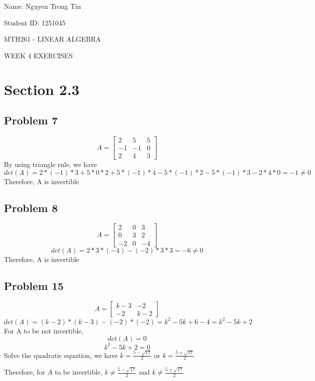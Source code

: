\documentclass[a4paper,12pt]{report}
\begin{document}
Name: Nguyen Trong Tin

Student ID: 1251045 

\centerline{MTH261 - LINEAR ALGEBRA}
\centerline{WEEK 4 EXERCISES}

\section*{Section 2.3}
\subsection*{Problem 7}
\[
A 
=
\begin{bmatrix}
    2       & 5 & 5 \\
    -1       & -1 & 0 \\
    2       & 4 & 3
\end{bmatrix}
\]
By using triangle rule, we have
\[
det(A)=2*(-1)*3+5*0*2+5*(-1)*4-5*(-1)*2-5*(-1)*3-2*4*0=-1\neq0\]
Therefore, A is invertible

\subsection*{Problem 8}
\[
A 
=
\begin{bmatrix}
    2       & 0 & 3 \\
    0       & 3 & 2 \\
    -2       & 0 & -4
\end{bmatrix}
\]
\[det(A)=2*3*(-4)-(-2)*3*3=-6\neq0\]
Therefore, A is invertible

\subsection*{Problem 15}
\[
A 
=
\begin{bmatrix}
    k-3       & -2  \\
    -2       & k-2  
\end{bmatrix}
\]
\[det(A)=(k-2)*(k-3)-(-2)*(-2)=k^2-5k+6-4=k^2-5k+2\]
For A to be not invertible,
\[det(A)=0\]
\[k^2-5k+2=0\]
Solve the quadratic equation, we have \(k=\frac{5-\sqrt{17}}{2}\) or \(k=\frac{5+\sqrt{17}}{2}\)

Therefore, for \(A\) to be invertible, \(k\neq\frac{5-\sqrt{17}}{2}\) and \(k\neq\frac{5+\sqrt{17}}{2}\)
\end{document}
